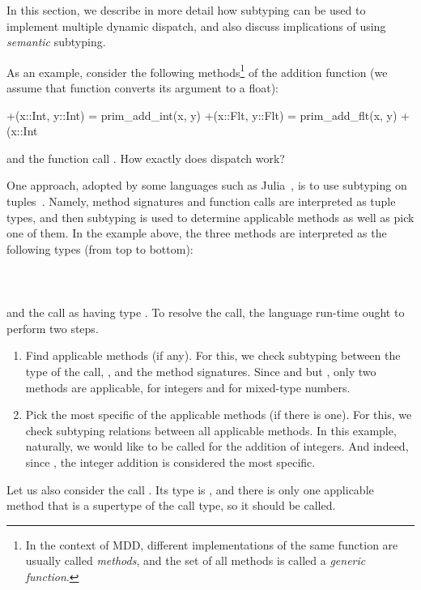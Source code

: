 In this section, we describe in more detail how subtyping
can be used to implement multiple dynamic dispatch,
and also discuss implications of using \emph{semantic} subtyping.

As an example, consider the following methods\footnote{In the context of MDD, 
	different implementations of 
	the same function are usually called \emph{methods},
	and the set of all methods is called a \emph{generic function}.}
of the addition function (we assume that function  
converts its argument to a float):
\begin{lstminijl}
+(x::Int, y::Int) = prim_add_int(x, y) 
+(x::Flt, y::Flt) = prim_add_flt(x, y) 
+(x::Int%
\end{lstminijl}
and the function call .
How exactly does dispatch work?

One approach, adopted by some languages
such as Julia~\cite{Bezanson2015AbstractionIT}, 
is to use subtyping on tuples~\cite{bib:Leavens:1998:mddtuples}.
Namely, method signatures and function calls are interpreted as tuple types,
and then subtyping is used to determine applicable methods 
as well as pick one of them.
In the example above, the three methods are interpreted 
as the following types (from top to bottom):\\
\\
\\
\\
and the call as having type .
To resolve the call, the language run-time ought to perform two steps.
\begin{enumerate}
  \item Find applicable methods (if any). For this, we check subtyping between
    the type of the call, , and the method signatures.
    Since  and  but
    , only two methods are applicable,
     for integers and  for mixed-type numbers.
  \item Pick the most specific of the applicable methods
    (if there is one).
    For this, we check subtyping relations between all applicable methods.
    In this example, naturally, we would like  to be called
    for the addition of integers. And indeed, since ,
    the integer addition is considered the most specific.
\end{enumerate}
Let us also consider the call . Its type is
, and there is only one applicable method 
that is a supertype of the call type, so it should be called.

